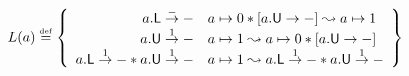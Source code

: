 %
\[
	L(a) \eqdef 
	\left\{
	\begin{array}{r l}
		\lockT{a}[-]&  \cell{a}{0} * \unlockC{a}  \swap \cell{a}{1}\\
		\unlockT{a}[1]&  \cell{a}{1} \swap \cell{a}{0} * \unlockC{a} \\
		\lockT{a}[1] * \unlockT{a}[1] &  \cell{a}{1} \swap \lockT{a}[1] * \unlockT{a}[1]
	\end{array}
	\right\}
\]
%
%		
%		
%		
%		
%				 	
